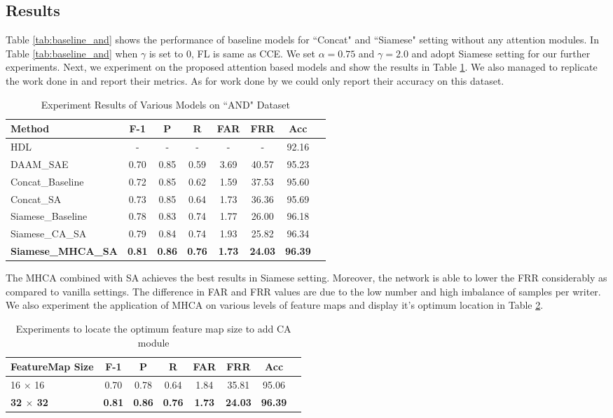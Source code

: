 \documentclass[a4paper,conference]{IEEEtran}
\begin{document}
\subsection{Results}
Table \ref{tab:baseline_and} shows the performance of baseline models for ``Concat" and ``Siamese" setting without any attention modules. In Table \ref{tab:baseline_and} when $\gamma$ is set to $0$, FL is same as CCE.
We set $\alpha=0.75$ and $\gamma = 2.0$ and adopt Siamese setting for our further experiments.
\newline \indent Next, we experiment on the proposed attention based models and show the results in Table \ref{tab:results}. We also managed to replicate the work done in \cite{chauhan_explanation_2019} and report their metrics. As for work done by \cite{shaikh_hybrid_2018} we could only report their accuracy on this dataset. 
\begin{table}[!htp]\centering
\caption{Experiment Results of Various Models on ``AND" Dataset}\label{tab:results}
\scriptsize
\begin{tabular}{lccccccc}\toprule
\textbf{Method} &\textbf{F-1} &\textbf{P} &\textbf{R} &\textbf{FAR} &\textbf{FRR} &\textbf{Acc} \\\midrule
HDL \cite{shaikh_hybrid_2018} &- &- &- &- &- &92.16 \\
DAAM\_SAE \cite{chauhan_explanation_2019} &0.70 &0.85 &0.59 &3.69 &40.57 &95.23 \\
Concat\_Baseline &0.72 &0.85 &0.62 &1.59 &37.53 &95.60 \\
Concat\_SA &0.73 &0.85 &0.64 &1.73 &36.36 &95.69 \\
Siamese\_Baseline &0.78 &0.83 &0.74 &1.77 &26.00 &96.18 \\
Siamese\_CA\_SA &0.79 &0.84 &0.74 &1.93 &25.82 &96.34 \\
\textbf{Siamese\_MHCA\_SA} &\textbf{0.81} &\textbf{0.86} &\textbf{0.76} &\textbf{1.73} &\textbf{24.03} &\textbf{96.39} \\
\bottomrule
\end{tabular}
\end{table}
The MHCA combined with SA achieves the best results in Siamese setting. Moreover, the network is able to lower the FRR considerably as compared to vanilla settings. The difference in FAR and FRR values are due to the low number and high imbalance of samples per writer. We also experiment the application of MHCA on various levels of feature maps and display it's optimum location in Table \ref{tab:ca_postion}.
\begin{table}[!htp]\centering
\caption{Experiments to locate the optimum feature map size to add CA module}\label{tab:ca_postion}
\scriptsize
\begin{tabular}{lccccccc}\toprule
\textbf{FeatureMap Size} &\textbf{F-1} &\textbf{P} &\textbf{R} &\textbf{FAR} &\textbf{FRR} &\textbf{Acc} \\\midrule
16 $\times$ 16 &0.70 &0.78 &0.64 &1.84 &35.81 &95.06 \\
\textbf{32 $\times$ 32} &\textbf{0.81} &\textbf{0.86} &\textbf{0.76} &\textbf{1.73} &\textbf{24.03} &\textbf{96.39} \\
\bottomrule
\end{tabular}
\end{table}
\end{document}
